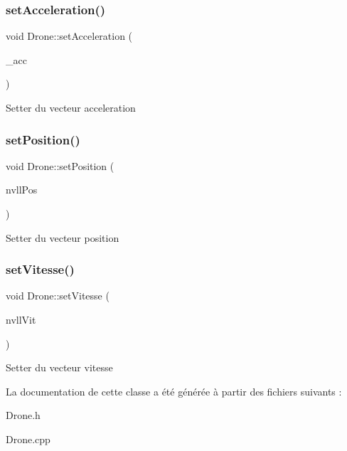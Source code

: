 \subsubsection{\texorpdfstring{set\+Acceleration()}{setAcceleration()}}
{\footnotesize\ttfamily void Drone\+::set\+Acceleration (\begin{DoxyParamCaption}\item[{const \mbox{\hyperlink{class_vecteur_r3}{Vecteur\+R3}} \&}]{\+\_\+acc }\end{DoxyParamCaption})}

Setter du vecteur acceleration \mbox{\label{class_drone_a6a379b028a7c5b48bac16966fef5e1a4}} 
\subsubsection{\texorpdfstring{set\+Position()}{setPosition()}}
{\footnotesize\ttfamily void Drone\+::set\+Position (\begin{DoxyParamCaption}\item[{const \mbox{\hyperlink{class_vecteur_r3}{Vecteur\+R3}}}]{nvll\+Pos }\end{DoxyParamCaption})}

Setter du vecteur position \mbox{\label{class_drone_a63d698e315ebab5f36dd74447259828f}} 
\subsubsection{\texorpdfstring{set\+Vitesse()}{setVitesse()}}
{\footnotesize\ttfamily void Drone\+::set\+Vitesse (\begin{DoxyParamCaption}\item[{const \mbox{\hyperlink{class_vecteur_r3}{Vecteur\+R3}}}]{nvll\+Vit }\end{DoxyParamCaption})}

Setter du vecteur vitesse 

La documentation de cette classe a été générée à partir des fichiers suivants \+:\begin{DoxyCompactItemize}
\item 
Drone.\+h\item 
Drone.\+cpp\end{DoxyCompactItemize}
